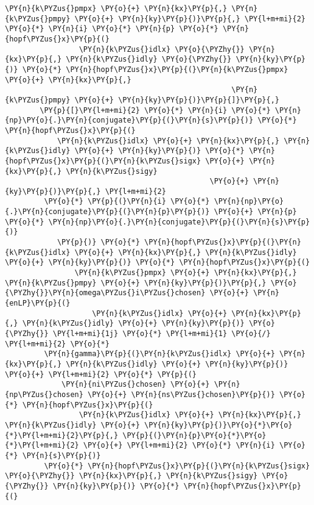 \begin{Verbatim}[commandchars=\\\{\}]
             \PY{n}{k\PYZus{}pmpx} \PY{o}{+} \PY{n}{kx}\PY{p}{,} \PY{n}{k\PYZus{}pmpy} \PY{o}{+} \PY{n}{ky}\PY{p}{)}\PY{p}{,} \PY{l+m+mi}{2} \PY{o}{*} \PY{n}{i} \PY{o}{*} \PY{n}{p} \PY{o}{*} \PY{n}{hopf\PYZus{}x}\PY{p}{(}
                 \PY{n}{k\PYZus{}idlx} \PY{o}{\PYZhy{}} \PY{n}{kx}\PY{p}{,} \PY{n}{k\PYZus{}idly} \PY{o}{\PYZhy{}} \PY{n}{ky}\PY{p}{)} \PY{o}{*} \PY{n}{hopf\PYZus{}x}\PY{p}{(}\PY{n}{k\PYZus{}pmpx} \PY{o}{+} \PY{n}{kx}\PY{p}{,}
                                                    \PY{n}{k\PYZus{}pmpy} \PY{o}{+} \PY{n}{ky}\PY{p}{)}\PY{p}{]}\PY{p}{,}
        \PY{p}{[}\PY{l+m+mi}{2} \PY{o}{*} \PY{n}{i} \PY{o}{*} \PY{n}{np}\PY{o}{.}\PY{n}{conjugate}\PY{p}{(}\PY{n}{s}\PY{p}{)} \PY{o}{*} \PY{n}{hopf\PYZus{}x}\PY{p}{(}
            \PY{n}{k\PYZus{}idlx} \PY{o}{+} \PY{n}{kx}\PY{p}{,} \PY{n}{k\PYZus{}idly} \PY{o}{+} \PY{n}{ky}\PY{p}{)} \PY{o}{*} \PY{n}{hopf\PYZus{}x}\PY{p}{(}\PY{n}{k\PYZus{}sigx} \PY{o}{+} \PY{n}{kx}\PY{p}{,} \PY{n}{k\PYZus{}sigy}
                                               \PY{o}{+} \PY{n}{ky}\PY{p}{)}\PY{p}{,} \PY{l+m+mi}{2}
         \PY{o}{*} \PY{p}{(}\PY{n}{i} \PY{o}{*} \PY{n}{np}\PY{o}{.}\PY{n}{conjugate}\PY{p}{(}\PY{n}{p}\PY{p}{)} \PY{o}{+} \PY{n}{p} \PY{o}{*} \PY{n}{np}\PY{o}{.}\PY{n}{conjugate}\PY{p}{(}\PY{n}{s}\PY{p}{)}
            \PY{p}{)} \PY{o}{*} \PY{n}{hopf\PYZus{}x}\PY{p}{(}\PY{n}{k\PYZus{}idlx} \PY{o}{+} \PY{n}{kx}\PY{p}{,} \PY{n}{k\PYZus{}idly} \PY{o}{+} \PY{n}{ky}\PY{p}{)} \PY{o}{*} \PY{n}{hopf\PYZus{}x}\PY{p}{(}
                \PY{n}{k\PYZus{}pmpx} \PY{o}{+} \PY{n}{kx}\PY{p}{,} \PY{n}{k\PYZus{}pmpy} \PY{o}{+} \PY{n}{ky}\PY{p}{)}\PY{p}{,} \PY{o}{\PYZhy{}}\PY{n}{omega\PYZus{}i\PYZus{}chosen} \PY{o}{+} \PY{n}{enLP}\PY{p}{(}
                    \PY{n}{k\PYZus{}idlx} \PY{o}{+} \PY{n}{kx}\PY{p}{,} \PY{n}{k\PYZus{}idly} \PY{o}{+} \PY{n}{ky}\PY{p}{)} \PY{o}{\PYZhy{}} \PY{l+m+mi}{1j} \PY{o}{*} \PY{l+m+mi}{1} \PY{o}{/} \PY{l+m+mi}{2} \PY{o}{*}
         \PY{n}{gamma}\PY{p}{(}\PY{n}{k\PYZus{}idlx} \PY{o}{+} \PY{n}{kx}\PY{p}{,} \PY{n}{k\PYZus{}idly} \PY{o}{+} \PY{n}{ky}\PY{p}{)} \PY{o}{+} \PY{l+m+mi}{2} \PY{o}{*} \PY{p}{(}
             \PY{n}{ni\PYZus{}chosen} \PY{o}{+} \PY{n}{np\PYZus{}chosen} \PY{o}{+} \PY{n}{ns\PYZus{}chosen}\PY{p}{)} \PY{o}{*} \PY{n}{hopf\PYZus{}x}\PY{p}{(}
                 \PY{n}{k\PYZus{}idlx} \PY{o}{+} \PY{n}{kx}\PY{p}{,} \PY{n}{k\PYZus{}idly} \PY{o}{+} \PY{n}{ky}\PY{p}{)}\PY{o}{*}\PY{o}{*}\PY{l+m+mi}{2}\PY{p}{,} \PY{p}{(}\PY{n}{p}\PY{o}{*}\PY{o}{*}\PY{l+m+mi}{2} \PY{o}{+} \PY{l+m+mi}{2} \PY{o}{*} \PY{n}{i} \PY{o}{*} \PY{n}{s}\PY{p}{)}
         \PY{o}{*} \PY{n}{hopf\PYZus{}x}\PY{p}{(}\PY{n}{k\PYZus{}sigx} \PY{o}{\PYZhy{}} \PY{n}{kx}\PY{p}{,} \PY{n}{k\PYZus{}sigy} \PY{o}{\PYZhy{}} \PY{n}{ky}\PY{p}{)} \PY{o}{*} \PY{n}{hopf\PYZus{}x}\PY{p}{(}

\end{Verbatim}
